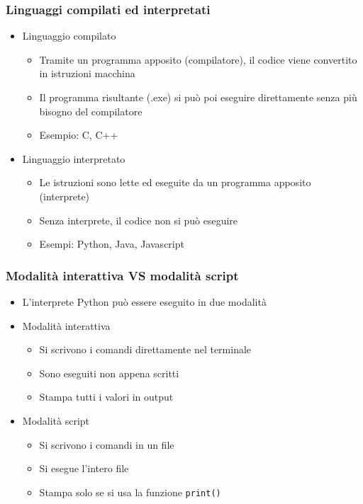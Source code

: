 \begin{exampleframe}
    \frametitle{Linguaggi compilati ed interpretati}

    \begin{itemize}
        \item Linguaggio compilato
        \begin{itemize}
            \item Tramite un programma apposito (compilatore), il codice viene convertito in istruzioni macchina
            \item Il programma risultante (.exe) si può poi eseguire direttamente senza più bisogno del compilatore
            \item Esempio: C, C++
        \end{itemize}

        \bigskip
        \item Linguaggio interpretato
        \begin{itemize}
            \item Le istruzioni sono lette ed eseguite da un programma apposito (interprete)
            \item Senza interprete, il codice non si può eseguire
            \item Esempi: Python, Java, Javascript
        \end{itemize}
    \end{itemize}
\end{exampleframe}

\begin{contentframe}
    \frametitle{Modalità interattiva VS modalità script}

    \begin{itemize}
        \item L'interprete Python può essere eseguito in due modalità

        \bigskip
        \item Modalità interattiva
        \begin{itemize}
            \item Si scrivono i comandi direttamente nel terminale
            \item Sono eseguiti non appena scritti
            \item Stampa tutti i valori in output
        \end{itemize}

        \bigskip
        \item Modalità script
        \begin{itemize}
            \item Si scrivono i comandi in un file
            \item Si esegue l'intero file
            \item Stampa solo se si usa la funzione \texttt{print()}
        \end{itemize}
    \end{itemize}
\end{contentframe}

